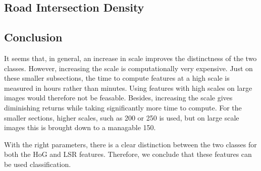\subsection{Road Intersection Density}


\subsection{Conclusion}

It seems that, in general, an increase in scale improves the distinctness of
the two classes. However, increasing the scale is computationally very
expensive. Just on these smaller subsections, the time to compute features at
a high scale is measured in hours rather than minutes. Using features with high
scales on large images would therefore not be feasable. Besides, increasing the
scale gives diminishing returns while taking significantly more time to
compute. For the smaller sections, higher scales, such as 200 or 250 is
used, but on large scale images this is brought down to a managable 150.

With the right parameters, there is a clear distinction between the two classes
for both the HoG and LSR features. Therefore, we conclude that these features
can be used classification. 



